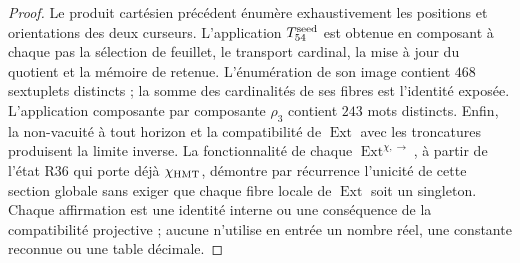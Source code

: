 \begin{proof}
Le produit cartésien précédent énumère exhaustivement les positions et
orientations des deux curseurs. L'application \(T_{54}^{\rm seed}\) est obtenue en
composant à chaque pas la sélection de feuillet, le transport cardinal, la
mise à jour du quotient et la mémoire de retenue. L'énumération de son
image contient \(468\) sextuplets distincts ; la somme des cardinalités de
ses fibres est l'identité exposée. L'application composante par composante
\(\rho_3\) contient \(243\) mots distincts. Enfin, la non-vacuité à
tout horizon et la compatibilité de \(\operatorname{Ext}\) avec les
troncatures produisent la limite inverse. La fonctionnalité de chaque
\(\operatorname{Ext}^{\chi,\rightarrow}\), à partir de l'état R36 qui
porte déjà \(\chi_{\rm HMT}\), démontre par récurrence l'unicité de cette section
globale sans exiger que chaque fibre locale de \(\operatorname{Ext}\) soit
un singleton. Chaque affirmation est une identité interne ou une conséquence de la
compatibilité projective ; aucune n'utilise en entrée un nombre réel, une
constante reconnue ou une table décimale.
\end{proof}

